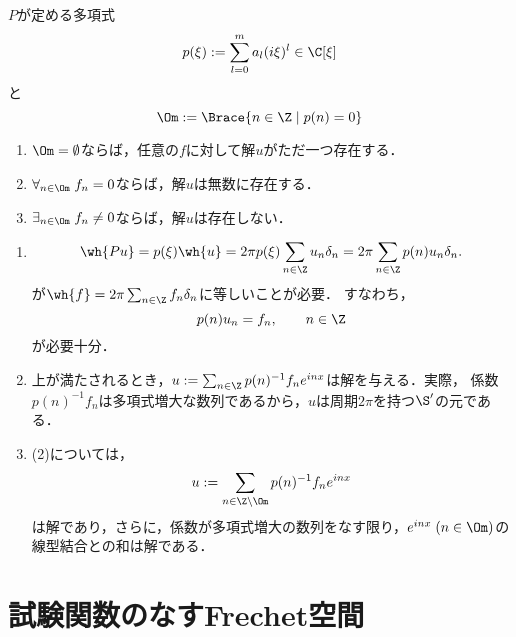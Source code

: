 \documentclass[uplatex,dvipdfmx]{jsreport}
\begin{document}
\begin{proposition}
    $P$が定める多項式
    \[p(\xi):=\sum_{l=0}^ma_l(i\xi)^l\in\C[\xi]\]
    と
    \[\Om:=\Brace{n\in\Z\mid p(n)=0}\]
    \begin{enumerate}
        \item $\Om=\emptyset$ならば，任意の$f$に対して解$u$がただ一つ存在する．
        \item $\forall_{n\in\Om}\;f_n=0$ならば，解$u$は無数に存在する．
        \item $\exists_{n\in\Om}\;f_n\ne0$ならば，解$u$は存在しない．
    \end{enumerate}
\end{proposition}
\begin{Proof}\mbox{}
    \begin{enumerate}[{Step}1]
        \item 
        \[\wh{Pu}=p(\xi)\wh{u}=2\pi p(\xi)\sum_{n\in\Z}u_n\delta_n=2\pi\sum_{n\in\Z}p(n)u_n\delta_n.\]
        が$\wh{f}=2\pi\sum_{n\in\Z}f_n\delta_n$に等しいことが必要．
        すなわち，
        \[p(n)u_n=f_n,\qquad n\in\Z\]
        が必要十分．
        \item 上が満たされるとき，$u:=\sum_{n\in\Z}p(n)^{-1}f_ne^{inx}$は解を与える．実際，
        係数$p(n)^{-1}f_n$は多項式増大な数列であるから，$u$は周期$2\pi$を持つ$\S'$の元である．
        \item (2)については，
        \[u:=\sum_{n\in\Z\setminus\Om}p(n)^{-1}f_ne^{inx}\]
        は解であり，さらに，係数が多項式増大の数列をなす限り，$e^{inx}\;(n\in\Om)$の線型結合との和は解である．
    \end{enumerate}
\end{Proof}

\section{試験関数のなすFrechet空間}
\end{document}
